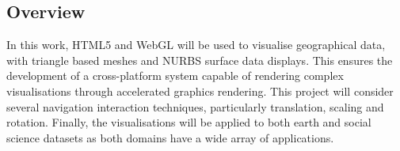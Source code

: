 \documentclass[
	fontsize=11pt
	headlines=2,
	footlines=2,
	parskip=half
]{scrartcl}
\begin{document}
{		%

		\subsection{Overview} {

			In this work, HTML5 and WebGL will be used to visualise geographical data, with triangle based meshes and NURBS surface data displays. This ensures the development of a cross-platform system capable of rendering complex visualisations through accelerated graphics rendering. This project will consider several navigation interaction techniques, particularly translation, scaling and rotation. Finally, the visualisations will be applied to both earth and social science datasets as both domains have a wide array of applications.

		}
	
	}
	
\end{document}
